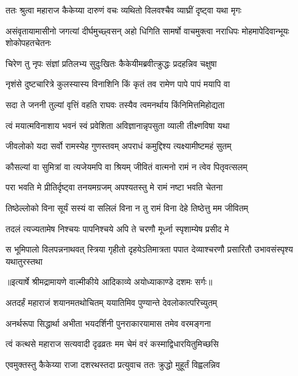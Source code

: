 \twolineshloka
{ततः श्रुत्वा महाराज कैकेय्या दारुणं वचः}
{व्यथितो विलवश्चैव व्याघ्रीं दृष्ट्वा यथा मृगः} %

\threelineshloka
{असंवृतायामासीनो जगत्यां दीर्घमुच्छ्वसन्}
{अहो धिगिति सामर्षो वाचमुक्त्वा नराधिपः}
{मोहमापेदिवान्भूयः शोकोपहतचेतनः} %

\twolineshloka
{चिरेण तु नृपः संज्ञां प्रतिलभ्य सुदुःखितः}
{कैकेयीमब्रवीत्क्रुद्धः प्रदहन्निव चक्षुषा} %

\twolineshloka
{नृशंसे दुष्टचारित्रे कुलस्यास्य विनाशिनि}
{किं कृतं तव रामेण पापे पापं मयापि वा} %

\twolineshloka
{सदा ते जननी तुल्यां वृत्तिं वहति राघवः}
{तस्यैव त्वमनर्थाय किंनिमित्तमिहोद्यता} %

\twolineshloka
{त्वं मयात्मविनाशाय भवनं स्वं प्रवेशिता}
{अविज्ञानान्नृपसुता व्याली तीक्ष्णविषा यथा} %

\twolineshloka
{जीवलोको यदा सर्वो रामस्येह गुणस्तवम्}
{अपराधं कमुद्दिश्य त्यक्ष्यामीष्टमहं सुतम्} %

\twolineshloka
{कौसल्यां वा सुमित्रां वा त्यजेयमपि वा श्रियम्}
{जीवितं वात्मनो रामं न त्वेव पितृवत्सलम्} %

\twolineshloka
{परा भवति मे प्रीतिर्दृष्ट्वा तनयमग्रजम्}
{अपश्यतस्तु मे रामं नष्टा भवति चेतना} %

\twolineshloka
{तिष्ठेल्लोको विना सूर्यं सस्यं वा सलिलं विना}
{न तु रामं विना देहे तिष्ठेत्तु मम जीवितम्} %

\twolineshloka
{तदलं त्यज्यतामेष निश्चयः पापनिश्चये}
{अपि ते चरणौ मूर्ध्ना स्पृशाम्येष प्रसीद मे} %

\fourlineindentedshloka
{स भूमिपालो विलपन्ननाथवत्}
{स्त्रिया गृहीतो दृहयेऽतिमात्रता}
{पपात देव्याश्चरणौ प्रसारितौ}
{उभावसंस्पृश्य यथातुरस्तथा} %


{॥इत्यार्षे श्रीमद्रामायणे वाल्मीकीये आदिकाव्ये अयोध्याकाण्डे दशमः सर्गः॥}


\twolineshloka
{अतदर्हं महाराजं शयानमतथोचितम्}
{ययातिमिव पुण्यान्ते देवलोकात्परिच्युतम्} %

\twolineshloka
{अनर्थरूपा सिद्धार्था अभीता भयदर्शिनी}
{पुनराकारयामास तमेव वरमङ्गना} %

\twolineshloka
{त्वं कत्थसे महाराज सत्यवादी दृढव्रतः}
{मम चेमं वरं कस्माद्विधारयितुमिच्छसि} %

\twolineshloka
{एवमुक्तस्तु कैकेय्या राजा दशरथस्तदा}
{प्रत्युवाच ततः क्रुद्धो मुहूर्तं विह्वलन्निव} %

